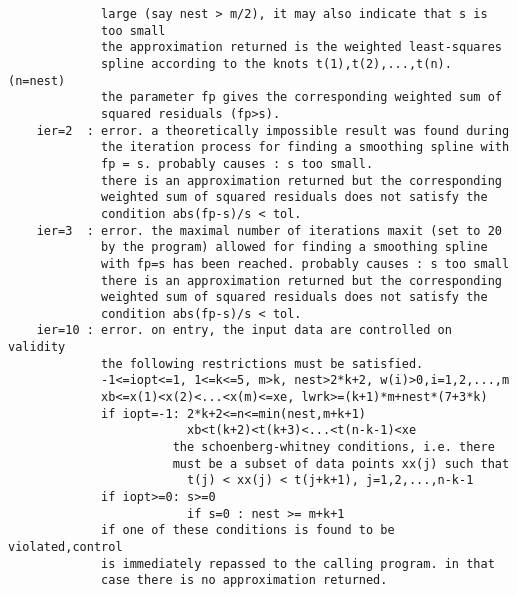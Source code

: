 \begin{verbatim}
             large (say nest > m/2), it may also indicate that s is
             too small
             the approximation returned is the weighted least-squares
             spline according to the knots t(1),t(2),...,t(n). (n=nest)
             the parameter fp gives the corresponding weighted sum of
             squared residuals (fp>s).
    ier=2  : error. a theoretically impossible result was found during
             the iteration process for finding a smoothing spline with
             fp = s. probably causes : s too small.
             there is an approximation returned but the corresponding
             weighted sum of squared residuals does not satisfy the
             condition abs(fp-s)/s < tol.
    ier=3  : error. the maximal number of iterations maxit (set to 20
             by the program) allowed for finding a smoothing spline
             with fp=s has been reached. probably causes : s too small
             there is an approximation returned but the corresponding
             weighted sum of squared residuals does not satisfy the
             condition abs(fp-s)/s < tol.
    ier=10 : error. on entry, the input data are controlled on validity
             the following restrictions must be satisfied.
             -1<=iopt<=1, 1<=k<=5, m>k, nest>2*k+2, w(i)>0,i=1,2,...,m
             xb<=x(1)<x(2)<...<x(m)<=xe, lwrk>=(k+1)*m+nest*(7+3*k)
             if iopt=-1: 2*k+2<=n<=min(nest,m+k+1)
                         xb<t(k+2)<t(k+3)<...<t(n-k-1)<xe
                       the schoenberg-whitney conditions, i.e. there
                       must be a subset of data points xx(j) such that
                         t(j) < xx(j) < t(j+k+1), j=1,2,...,n-k-1
             if iopt>=0: s>=0
                         if s=0 : nest >= m+k+1
             if one of these conditions is found to be violated,control
             is immediately repassed to the calling program. in that
             case there is no approximation returned.


\end{verbatim}
